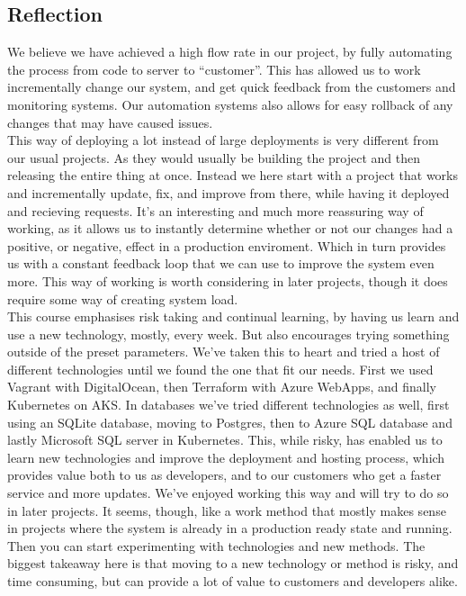 \subsection{Reflection}
We believe we have achieved a high flow rate in our project, by fully automating the process from code to server to ``customer''.
This has allowed us to work incrementally change our system, and get quick feedback from the customers and monitoring systems.
Our automation systems also allows for easy rollback of any changes that may have caused issues.\\

This way of deploying a lot instead of large deployments is very different from our usual projects. As they would usually be building the project and then releasing the entire thing at once.
Instead we here start with a project that works and incrementally update, fix, and improve from there, while having it deployed and recieving requests.
It's an interesting and much more reassuring way of working, as it allows us to instantly determine whether or not our changes had a positive, or negative, effect in a production enviroment.
Which in turn provides us with a constant feedback loop that we can use to improve the system even more.
This way of working is worth considering in later projects, though it does require some way of creating system load.\\

This course emphasises risk taking and continual learning, by having us learn and use a new technology, mostly, every week.
But also encourages trying something outside of the preset parameters.
We've taken this to heart and tried a host of different technologies until we found the one that fit our needs. First we used Vagrant with DigitalOcean, then Terraform with Azure WebApps, and finally Kubernetes on AKS.
In databases we've tried different technologies as well, first using an SQLite database, moving to Postgres, then to Azure SQL database and lastly Microsoft SQL server in Kubernetes.
This, while risky, has enabled us to learn new technologies and improve the deployment and hosting process, which provides value both to us as developers, and to our customers who get a faster service and more updates.
We've enjoyed working this way and will try to do so in later projects.
It seems, though, like a work method that mostly makes sense in projects where the system is already in a production ready state and running.
Then you can start experimenting with technologies and new methods.
The biggest takeaway here is that moving to a new technology or method is risky, and time consuming, but can provide a lot of value to customers and developers alike.

